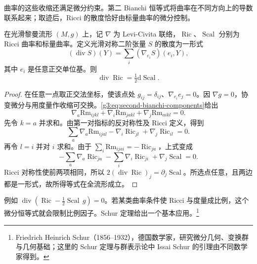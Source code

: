 \ProseParagraphBreak

曲率的这些收缩还满足微分约束。第二 Bianchi 恒等式将曲率在不同方向上的导数联系起来；取迹后，Ricci 的散度恰好由标量曲率的微分控制。

\begin{proposition}
	\label{g3:prop:contracted-bianchi}
	在光滑黎曼流形 \((M,g)\) 上，记 \(\nabla\) 为 Levi-Civita 联络，\(\operatorname{Ric}\)、\(\operatorname{Scal}\) 分别为 Ricci 曲率和标量曲率。定义光滑对称二阶张量 \(S\) 的散度为一形式
	\[
		(\operatorname{div}S)(Y)=\sum_i(\nabla_{e_i}S)(e_i,Y),
	\]
	其中 \(e_i\) 是任意正交单位基。则
	\begin{equation}
		\label{g3:eq:contracted-bianchi}
		\operatorname{div}\operatorname{Ric}=\tfrac12\mathrm{d}\operatorname{Scal}.
	\end{equation}
\end{proposition}
\begin{proof}
	在任意一点取正交法坐标，使该点处 \(g_{ij}=\delta_{ij}\)、\(\nabla_{e_i}e_j=0\)。因 \(\nabla g=0\)，协变微分与用度量作收缩可交换。\eqref{g3:eq:second-bianchi-components}给出
	\[
		\nabla_a\mathrm{Rm}_{ijkl}
		+\nabla_i\mathrm{Rm}_{jakl}
		+\nabla_j\mathrm{Rm}_{aikl}=0.
	\]
	先令 \(k=a\) 并求和。由第一对指标的反对称性及 Ricci 定义，得到
	\[
		\sum_a\nabla_a\mathrm{Rm}_{ijal}
		-\nabla_i\operatorname{Ric}_{jl}
		+\nabla_j\operatorname{Ric}_{il}=0.
	\]
	再令 \(l=i\) 并对 \(i\) 求和。由于 \(\sum_i\mathrm{Rm}_{ijai}=-\operatorname{Ric}_{ja}\)，上式变成
	\[
		-\sum_a\nabla_a\operatorname{Ric}_{ja}
		-\sum_i\nabla_i\operatorname{Ric}_{ji}
		+\nabla_j\operatorname{Scal}=0.
	\]
	Ricci 对称性使前两项相同，所以 \(2(\operatorname{div}\operatorname{Ric})_j=\partial_j\operatorname{Scal}\)。所选点任意，且两边都是一形式，故所得等式在全流形成立。
\end{proof}

例如 \(\operatorname{div}(\operatorname{Ric}-\tfrac12\operatorname{Scal}\,g)=0\)。若某类曲率条件使 Ricci 与度量成比例，这个微分恒等式就会限制比例因子。Schur 定理给出一个基本应用。\footnote{Friedrich Heinrich Schur（1856--1932），德国数学家，研究微分几何、变换群与几何基础；这里的 Schur 定理与群表示论中 Issai Schur 的引理由不同数学家得到。}

